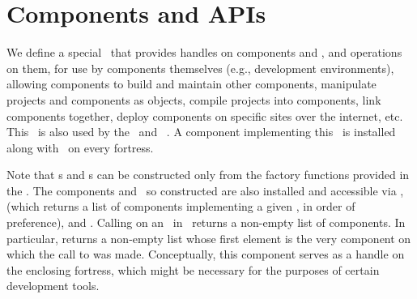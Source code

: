 %
%
%
%

\chapter{Components and APIs}

We define a special  \apiN\ that provides
handles on components and \apisN, 
and operations on them, for use by components themselves (e.g., development
environments), allowing components to build and maintain other components,
manipulate projects and components as objects,
compile projects into components, link components together,
deploy components on specific sites over the internet, etc.
This \apiN\ is also used by the \upgapi\ and \instapi\ \apisN.
A component implementing this \apiN\ is installed along with 
\library\ on every fortress.

Note that s and s 
can be constructed only from the factory functions provided in the \apiN.
The components and \apisN\ so constructed are also installed and 
accessible via ,  (which returns a list of components
implementing a given \apiN, in order of preference), and .
Calling  on an \apiN\ in \library\
returns a non-empty list of components. In particular,
 returns a non-empty 
list whose first element is the very component on which the call to  was made.
Conceptually, this component serves as a handle on the enclosing fortress, which might be necessary
for the purposes of certain development tools.  

